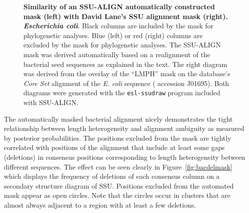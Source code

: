 \begin{figure}
{    \textbf{Similarity of an SSU-ALIGN automatically
      constructed mask (left) with David Lane's SSU alignment mask (right).
    \emph{Escherichia coli}}. Black columns are included by
  the mask for phylogenetic analyses. Blue (left) or red (right) columns are excluded
  by the mask for phylogenetic analyses. 
  The SSU-ALIGN mask was derived automatically based on a
    realignment of the bacterial seed sequences as explained in the
    text. The right diagram was derived from the overlay of the ``LMPH'' mask on the
   database's \emph{Core Set} alignment of the
  \emph{E. coli} sequence ( accession J01695). Both diagrams
    were generated with the {\tt esl-ssudraw} program included 
    with SSU-ALIGN}.
\label{fig:infvlane}
\end{figure}

The automatically masked bacterial alignment nicely 
demonstrates the tight relationship between length heterogeneity
and alignment ambiguity as measured by posterior probabilities. 
The positions excluded from the mask are tightly
correlated with positions of the alignment that include at least some
gaps (deletions) in consensus positions corresponding to length
heterogeneity between different sequences. The effect can be seen
clearly in Figure~\ref{fig:bacdelmask} which displays the frequency of
deletions of each consensus column on a secondary structure diagram of
SSU. Positions excluded from the automated mask appear as open
circles. Note that the circles occur in clusters that are almost
always adjacent to a region with at least a few deletions. 

